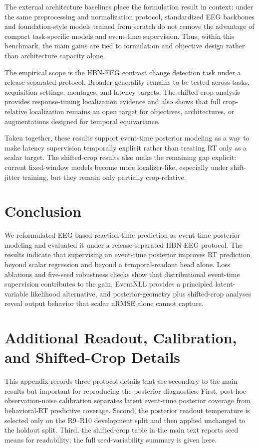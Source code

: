 \documentclass[12pt]{article}
\begin{document}
The external architecture baselines place the formulation result in context: under the same preprocessing and normalization protocol, standardized EEG backbones and foundation-style models trained from scratch do not remove the advantage of compact task-specific models and event-time supervision. Thus, within this benchmark, the main gains are tied to formulation and objective design rather than architecture capacity alone.

The empirical scope is the HBN-EEG contrast change detection task under a release-separated protocol. Broader generality remains to be tested across tasks, acquisition settings, montages, and latency targets. The shifted-crop analysis provides response-timing localization evidence and also shows that full crop-relative localization remains an open target for objectives, architectures, or augmentations designed for temporal equivariance.

Taken together, these results support event-time posterior modeling as a way to make latency supervision temporally explicit rather than treating RT only as a scalar target. The shifted-crop results also make the remaining gap explicit: current fixed-window models become more localizer-like, especially under shift-jitter training, but they remain only partially crop-relative.

\section{Conclusion}

We reformulated EEG-based reaction-time prediction as event-time posterior modeling and evaluated it under a release-separated HBN-EEG protocol. The results indicate that supervising an event-time posterior improves RT prediction beyond scalar regression and beyond a temporal-readout head alone. Loss ablations and five-seed robustness checks show that distributional event-time supervision contributes to the gain, EventNLL provides a principled latent-variable likelihood alternative, and posterior-geometry plus shifted-crop analyses reveal output behavior that scalar nRMSE alone cannot capture.

\appendix

\section{Additional Readout, Calibration, and Shifted-Crop Details}

This appendix records three protocol details that are secondary to the main results but important for reproducing the posterior diagnostics. First, post-hoc observation-noise calibration separates latent event-time posterior coverage from behavioral-RT predictive coverage. Second, the posterior readout temperature is selected only on the R9--R10 development split and then applied unchanged to the holdout split. Third, the shifted-crop table in the main text reports seed means for readability; the full seed-variability summary is given here.
\end{document}
